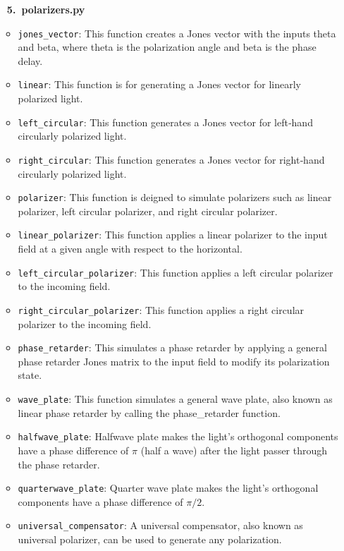 \documentclass[a4paper,12pt]{report}
\begin{document}
\begin{itemize}[itemsep=1em]
  \item[\large\bfseries 5.\ polarizers.py]
    \begin{itemize}[itemsep=0.5em]
      \item \texttt{jones\_vector}: This function creates a Jones vector with the inputs theta and beta, where theta is the polarization angle and beta is the phase delay.
      \item \texttt{linear}: This function is for generating a Jones vector for linearly polarized light.
      \item \texttt{left\_circular}: This function generates a Jones vector for left‐hand circularly polarized light.
      \item \texttt{right\_circular}: This function generates a Jones vector for right‐hand circularly polarized light.
      \item \texttt{polarizer}: This function is deigned to simulate polarizers such as linear polarizer, left circular polarizer, and right circular polarizer.
      \item \texttt{linear\_polarizer}: This function applies a linear polarizer to the input field at a given angle with respect to the horizontal.
      \item \texttt{left\_circular\_polarizer}: This function applies a left circular polarizer to the incoming field.
      \item \texttt{right\_circular\_polarizer}: This function applies a right circular polarizer to the incoming field.
      \item \texttt{phase\_retarder}: This simulates a phase retarder by applying a general phase retarder Jones matrix to the input field to modify its polarization state.
      \item \texttt{wave\_plate}: This function simulates a general wave plate, also known as linear phase retarder by calling the phase\_retarder function.
      \item \texttt{halfwave\_plate}: Halfwave plate makes the light's orthogonal components have a phase difference of $\pi$ (half a wave) after the light passer through the phase retarder.
      \item \texttt{quarterwave\_plate}: Quarter wave plate makes the light's orthogonal components have a phase difference of $\pi/2$.
      \item \texttt{universal\_compensator}: A universal compensator, also known as universal polarizer, can be used to generate any polarization.
    \end{itemize}


\end{itemize}
\end{document}
